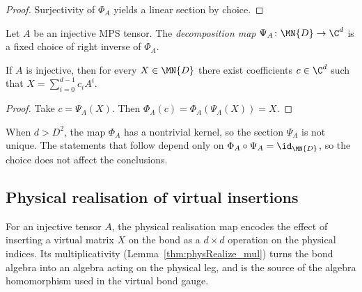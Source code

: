 \begin{proof}
    \leanok
    Surjectivity of $\Phi_A$ yields a linear section by choice.
\end{proof}

\begin{definition}\label{def:decomposition_map}
    \leanok
    Let $A$ be an injective MPS tensor.
    The \emph{decomposition map}
    $\Psi_A\colon\MN{D}\to\C^d$ is a fixed choice of right inverse of
    $\Phi_A$.
\end{definition}

\begin{lemma}\label{lem:exists_decomposition}
    \leanok
    If $A$ is injective, then for every $X\in\MN{D}$ there exist
    coefficients $c\in\C^d$ such that
    $X=\sum_{i=0}^{d-1}c_iA^i$.
\end{lemma}

\begin{proof}
    \leanok
    Take $c=\Psi_A(X)$. Then
    $\Phi_A(c)=\Phi_A(\Psi_A(X))=X$.
\end{proof}

\begin{remark}
    \label{rem:decomposition_nonunique}
    When $d>D^2$, the map $\Phi_A$ has a nontrivial kernel, so
    the section $\Psi_A$ is not unique.
    The statements that follow depend only on
    $\Phi_A\circ\Psi_A=\id_{\MN{D}}$, so the choice does not
    affect the conclusions.
\end{remark}

\subsection{Physical realisation of virtual insertions}%
\label{sec:phys_realize}

For an injective tensor $A$, the physical realisation map encodes the
effect of inserting a virtual matrix $X$ on the bond as a $d\times d$
operation on the physical indices. Its multiplicativity
(Lemma~\ref{thm:physRealize_mul}) turns the bond algebra into an algebra
acting on the physical leg, and is the source of the algebra homomorphism
used in the virtual bond gauge.


